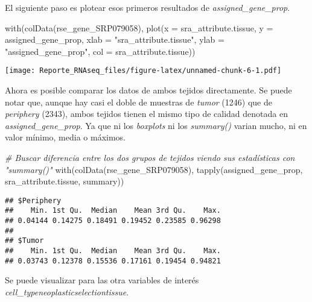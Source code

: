 \documentclass[
]{article}
\newenvironment{Shaded}{\begin{snugshade}}{\end{snugshade}}
\newcommand{\AttributeTok}[1]{\textcolor[rgb]{0.77,0.63,0.00}{#1}}
\newcommand{\CommentTok}[1]{\textcolor[rgb]{0.56,0.35,0.01}{\textit{#1}}}
\newcommand{\FunctionTok}[1]{\textcolor[rgb]{0.00,0.00,0.00}{#1}}
\newcommand{\NormalTok}[1]{#1}
\newcommand{\StringTok}[1]{\textcolor[rgb]{0.31,0.60,0.02}{#1}}
\begin{document}
El siguiente paso es plotear esos primeros resultados de
\emph{assigned\_gene\_prop}.

\begin{Shaded}
\begin{Highlighting}[]
\FunctionTok{with}\NormalTok{(}\FunctionTok{colData}\NormalTok{(rse\_gene\_SRP079058), }\FunctionTok{plot}\NormalTok{(}\AttributeTok{x =}\NormalTok{ sra\_attribute.tissue,}
                                       \AttributeTok{y =}\NormalTok{ assigned\_gene\_prop,}
                                       \AttributeTok{xlab =} \StringTok{"sra\_attribute.tissue"}\NormalTok{,}
                                       \AttributeTok{ylab =} \StringTok{"assigned\_gene\_prop"}\NormalTok{,}
                                       \AttributeTok{col =}\NormalTok{ sra\_attribute.tissue))}
\end{Highlighting}
\end{Shaded}

\texttt{[image: Reporte\_RNAseq\_files/figure-latex/unnamed-chunk-6-1.pdf]}

Ahora es posible comparar los datos de ambos tejidos directamente. Se
puede notar que, aunque hay casi el doble de muestras de \emph{tumor}
(1246) que de \emph{periphery} (2343), ambos tejidos tienen el mismo
tipo de calidad denotada en \emph{assigned\_gene\_prop}. Ya que ni los
\emph{boxplots} ni los \emph{summary()} varian mucho, ni en valor
mínimo, media o máximos.

\begin{Shaded}
\begin{Highlighting}[]
\CommentTok{\# Buscar diferencia entre los dos grupos de tejidos viendo sus estadísticas con "summary()"}
\FunctionTok{with}\NormalTok{(}\FunctionTok{colData}\NormalTok{(rse\_gene\_SRP079058), }\FunctionTok{tapply}\NormalTok{(assigned\_gene\_prop, sra\_attribute.tissue, summary))}
\end{Highlighting}
\end{Shaded}

\begin{verbatim}
## $Periphery
##    Min. 1st Qu.  Median    Mean 3rd Qu.    Max. 
## 0.04144 0.14275 0.18491 0.19452 0.23585 0.96298 
## 
## $Tumor
##    Min. 1st Qu.  Median    Mean 3rd Qu.    Max. 
## 0.03743 0.12378 0.15536 0.17161 0.19454 0.94821
\end{verbatim}

Se puede visualizar para las otra variables de interés
\emph{cell\_type\textbar neoplastic\textbar selection\textbar tissue}.
\end{document}
